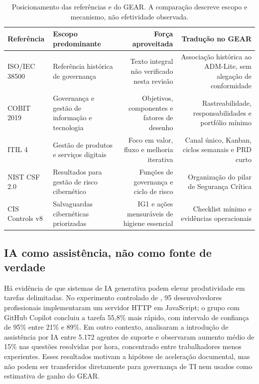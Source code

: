 \begin{table}[htbp]
  \centering
  \caption{Posicionamento das referências e do GEAR. A comparação descreve escopo e mecanismo, não efetividade observada.}
  \label{tab:posicionamento}
  \small
  \begin{tabularx}{\textwidth}{@{}L{2.3cm}L{3.0cm}R R@{}}
    \toprule
    Referência & Escopo predominante & Força aproveitada & Tradução no GEAR \\
    \midrule
    ISO/IEC 38500 & Referência histórica de governança & Texto integral não verificado nesta revisão & Associação histórica ao ADM-Lite, sem alegação de conformidade \\
    COBIT 2019 & Governança e gestão de informação e tecnologia & Objetivos, componentes e fatores de desenho & Rastreabilidade, responsabilidades e portfólio mínimo \\
    ITIL 4 & Gestão de produtos e serviços digitais & Foco em valor, fluxo e melhoria iterativa & Canal único, Kanban, ciclos semanais e PRD curto \\
    NIST CSF 2.0 & Resultados para gestão de risco cibernético & Funções de governança e ciclo de risco & Organização do pilar de Segurança Crítica \\
    CIS Controls v8 & Salvaguardas cibernéticas priorizadas & IG1 e ações mensuráveis de higiene essencial & Checklist mínimo e evidências operacionais \\
    \bottomrule
  \end{tabularx}
\end{table}

\subsection{IA como assistência, não como fonte de verdade}

Há evidência de que sistemas de IA generativa podem elevar produtividade em tarefas delimitadas. No experimento controlado de \citet{peng2023copilot}, 95 desenvolvedores profissionais implementaram um servidor HTTP em JavaScript; o grupo com GitHub Copilot concluiu a tarefa 55,8\% mais rápido, com intervalo de confiança de 95\% entre 21\% e 89\%. Em outro contexto, \citet{brynjolfsson2025work} analisaram a introdução de assistência por IA entre 5.172 agentes de suporte e observaram aumento médio de 15\% nas questões resolvidas por hora, concentrado entre trabalhadores menos experientes. Esses resultados motivam a hipótese de aceleração documental, mas não podem ser transferidos diretamente para governança de TI nem usados como estimativa de ganho do GEAR.


